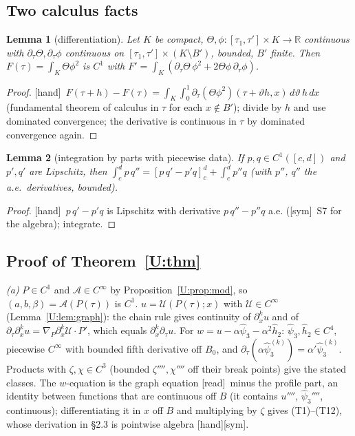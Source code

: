 \documentclass[11pt]{article}
\newtheorem{lemma}{Lemma}\newtheorem{proposition}{Proposition}\newtheorem{remark}{Remark}\newtheorem{theorem}{Theorem}\newtheorem{definition}{Definition}
\newcommand{\fn}[1]{\texttt{\detokenize{#1}}}
\newcommand{\tH}{\textup{[hand]}}\newcommand{\tS}{\textup{[sym]}}\newcommand{\tR}{\textup{[read]}}\newcommand{\tL}{\textup{[Lean]}}\newcommand{\tI}{\textup{[inh]}}
\begin{document}
\subsection{Two calculus facts}
\begin{lemma}[differentiation]\label{U:lem:leib}
Let $K$ be compact, $\Theta,\phi:[\tau_1,\tau']\times K\to\mathbb R$ continuous with $\partial_\tau\Theta,\partial_\tau\phi$ continuous on $[\tau_1,\tau']\times(K\setminus B')$, bounded, $B'$ finite. Then $F(\tau)=\int_K\Theta\phi^2$ is $C^1$ with $F'=\int_K(\partial_\tau\Theta\,\phi^2+2\Theta\phi\,\partial_\tau\phi)$.
\end{lemma}
\begin{proof}\tH\ $F(\tau+h)-F(\tau)=\int_K\int_0^1\partial_\tau(\Theta\phi^2)(\tau+\vartheta h,x)\,d\vartheta\,h\,dx$ (fundamental theorem of calculus in $\tau$ for each $x\notin B'$); divide by $h$ and use dominated convergence; the derivative is continuous in $\tau$ by dominated convergence again.
\end{proof}
\begin{lemma}[integration by parts with piecewise data]\label{U:lem:ibp}
If $p,q\in C^1([c,d])$ and $p',q'$ are Lipschitz, then $\int_c^dp\,q''=[p\,q'-p'q]_c^d+\int_c^dp''q$ (with $p''$, $q''$ the a.e.\ derivatives, bounded).
\end{lemma}
\begin{proof}\tH\ $p\,q'-p'q$ is Lipschitz with derivative $p\,q''-p''q$ a.e. (\tS\ S7 for the algebra); integrate.
\end{proof}

\subsection{Proof of Theorem~\ref{U:thm}}
\emph{(a)} $P\in C^1$ and $\mathcal A\in C^\infty$ by Proposition~\ref{U:prop:mod}, so $(a,b,\beta)=\mathcal A(P(\tau))$ is $C^1$. $u=\mathcal U(P(\tau);x)$ with $\mathcal U\in C^\infty$ (Lemma~\ref{U:lem:graph}): the chain rule gives continuity of $\partial_x^ku$ and of $\partial_\tau\partial_x^ku=\nabla_P\partial_x^k\mathcal U\cdot P'$, which equals $\partial_x^k\partial_\tau u$. For $w=u-\alpha\hat\psi_3-\alpha^2\hat h_2$: $\hat\psi_3,\hat h_2\in C^4$, piecewise $C^\infty$ with bounded fifth derivative off $B_0$, and $\partial_\tau(\alpha\hat\psi_3^{(k)})=\alpha'\hat\psi_3^{(k)}$. Products with $\zeta,\chi\in C^3$ (bounded $\zeta'''',\chi''''$ off their break points) give the stated classes. The $w$-equation is the graph equation \tR\ minus the profile part, an identity between functions that are continuous off $B$ (it contains $u''''$, $\hat\psi_3''''$, continuous); differentiating it in $x$ off $B$ and multiplying by $\zeta$ gives (T1)--(T12), whose derivation in \fn{EI_SPEC.md} \S2.3 is pointwise algebra \tH\tS.
\end{document}
